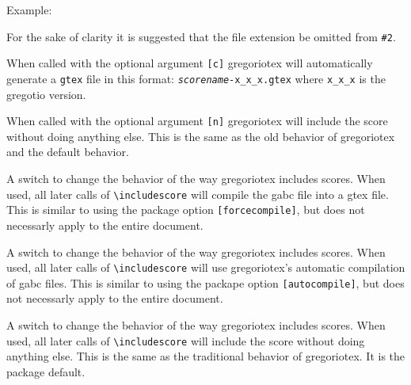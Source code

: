 Example:\par\medskip
\begin{latexcode}


\end{latexcode}

For the sake of clarity it is suggested that the file extension be
omitted from \texttt{\#2}.

When called with the optional argument \texttt{[c]} gregoriotex will
automatically generate a \texttt{gtex} file in this format:
\texttt{\textit{scorename}-x\_x\_x.gtex} where \texttt{x\_x\_x} is the
gregotio version.

When called with the optional argument \texttt{[n]} gregoriotex will
include the score without doing anything else. This is the same as the
old behavior of gregoriotex and the default behavior.

 A switch
to change the behavior of the way gregoriotex includes scores. When
used, all later calls of \verb=\includescore= will compile the gabc
file into a gtex file. This is similar to using the package option
\verb=[forcecompile]=, but does not necessarly apply to the entire
document.

 A switch
to change the behavior of the way gregoriotex includes scores. When
used, all later calls of \verb=\includescore= will use gregoriotex's
automatic compilation of gabc files. This is similar to using the
packape option \verb=[autocompile]=, but does not necessarly apply to
the entire document.

 A switch
to change the behavior of the way gregoriotex includes scores. When
used, all later calls of \verb=\includescore= will include the score
without doing anything else. This is the same as the traditional
behavior of gregoriotex. It is the package default.

